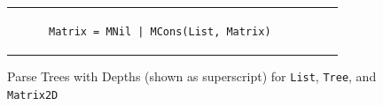 \begin{figure}[t]
\begin{tabular}{ccc}
\begin{subfigure}[b]{0.4\textwidth}
\begin{center}
\end{center}
\caption{\label{fig:matrixParseTree}{\tt Matrix = MNil | \newline MCons(List, Matrix)}}
\end{subfigure}%
\\
\end{tabular}
\vspace{-12px}
\caption{\label{fig:parseTrees}Parse Trees with Depths (shown as superscript) for {\tt List}, {\tt Tree}, and {\tt Matrix2D}}
\end{figure}
